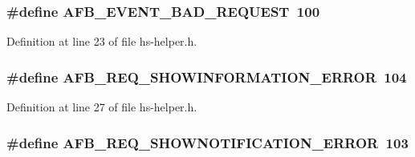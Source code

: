 \subsubsection[{\texorpdfstring{A\+F\+B\+\_\+\+E\+V\+E\+N\+T\+\_\+\+B\+A\+D\+\_\+\+R\+E\+Q\+U\+E\+ST}{AFB_EVENT_BAD_REQUEST}}]{\setlength{\rightskip}{0pt plus 5cm}\#define A\+F\+B\+\_\+\+E\+V\+E\+N\+T\+\_\+\+B\+A\+D\+\_\+\+R\+E\+Q\+U\+E\+ST~100}\hypertarget{hs-helper_8h_aa611e2ec24ef295bd87825889fe2ce5e}{}\label{hs-helper_8h_aa611e2ec24ef295bd87825889fe2ce5e}


Definition at line 23 of file hs-\/helper.\+h.

\subsubsection[{\texorpdfstring{A\+F\+B\+\_\+\+R\+E\+Q\+\_\+\+S\+H\+O\+W\+I\+N\+F\+O\+R\+M\+A\+T\+I\+O\+N\+\_\+\+E\+R\+R\+OR}{AFB_REQ_SHOWINFORMATION_ERROR}}]{\setlength{\rightskip}{0pt plus 5cm}\#define A\+F\+B\+\_\+\+R\+E\+Q\+\_\+\+S\+H\+O\+W\+I\+N\+F\+O\+R\+M\+A\+T\+I\+O\+N\+\_\+\+E\+R\+R\+OR~104}\hypertarget{hs-helper_8h_aefe0d7ff8202f954693c235c1fb8e310}{}\label{hs-helper_8h_aefe0d7ff8202f954693c235c1fb8e310}


Definition at line 27 of file hs-\/helper.\+h.

\subsubsection[{\texorpdfstring{A\+F\+B\+\_\+\+R\+E\+Q\+\_\+\+S\+H\+O\+W\+N\+O\+T\+I\+F\+I\+C\+A\+T\+I\+O\+N\+\_\+\+E\+R\+R\+OR}{AFB_REQ_SHOWNOTIFICATION_ERROR}}]{\setlength{\rightskip}{0pt plus 5cm}\#define A\+F\+B\+\_\+\+R\+E\+Q\+\_\+\+S\+H\+O\+W\+N\+O\+T\+I\+F\+I\+C\+A\+T\+I\+O\+N\+\_\+\+E\+R\+R\+OR~103}\hypertarget{hs-helper_8h_a057fc88b8445828c261305cf9107d99d}{}\label{hs-helper_8h_a057fc88b8445828c261305cf9107d99d}


